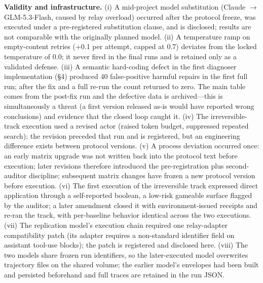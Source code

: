 \documentclass[10pt]{article}
\begin{document}
\textbf{Validity and infrastructure.} (i) A mid-project model substitution (Claude $\to$ GLM-5.3-Flash, caused by relay overload) occurred after the protocol freeze, was executed under a pre-registered substitution clause, and is disclosed; results are not comparable with the originally planned model. (ii) A temperature ramp on empty-content retries (+0.1 per attempt, capped at 0.7) deviates from the locked temperature of 0.0; it never fired in the final runs and is retained only as a validated defense. (iii) A semantic hard-coding defect in the first diagnoser implementation (\S4) produced 40 false-positive harmful repairs in the first full run; after the fix and a full re-run the count returned to zero. The main table comes from the post-fix run and the defective data is archived---this is simultaneously a threat (a first version released as-is would have reported wrong conclusions) and evidence that the closed loop caught it. (iv) The irreversible-track execution used a revised actor (raised token budget, suppressed repeated search); the revision preceded that run and is registered, but an engineering difference exists between protocol versions. (v) A process deviation occurred once: an early matrix upgrade was not written back into the protocol text before execution; later revisions therefore introduced the pre-registration plus second-auditor discipline; subsequent matrix changes have frozen a new protocol version before execution. (vi) The first execution of the irreversible track expressed direct application through a self-reported boolean, a low-risk gameable surface flagged by the auditor; a later amendment closed it with environment-issued receipts and re-ran the track, with per-baseline behavior identical across the two executions. (vii) The replication model's execution chain required one relay-adapter compatibility patch (its adapter requires a non-standard identifier field on assistant tool-use blocks); the patch is registered and disclosed here. (viii) The two models share frozen run identifiers, so the later-executed model overwrites trajectory files on the shared volume; the earlier model's envelopes had been built and persisted beforehand and full traces are retained in the run JSON.
\end{document}

